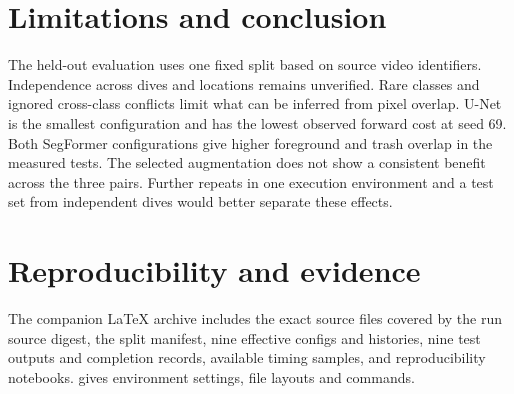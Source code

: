 \section{Limitations and conclusion}
The held-out evaluation uses one fixed split based on source video identifiers. Independence across dives and locations remains unverified. Rare classes and ignored cross-class conflicts limit what can be inferred from pixel overlap. U-Net is the smallest configuration and has the lowest observed forward cost at seed 69. Both SegFormer configurations give higher foreground and trash overlap in the measured tests. The selected augmentation does not show a consistent benefit across the three pairs. Further repeats in one execution environment and a test set from independent dives would better separate these effects.

\section{Reproducibility and evidence}
The companion LaTeX archive includes the exact source files covered by the run source digest, the split manifest, nine effective configs and histories, nine test outputs and completion records, available timing samples, and reproducibility notebooks.  gives environment settings, file layouts and commands.


